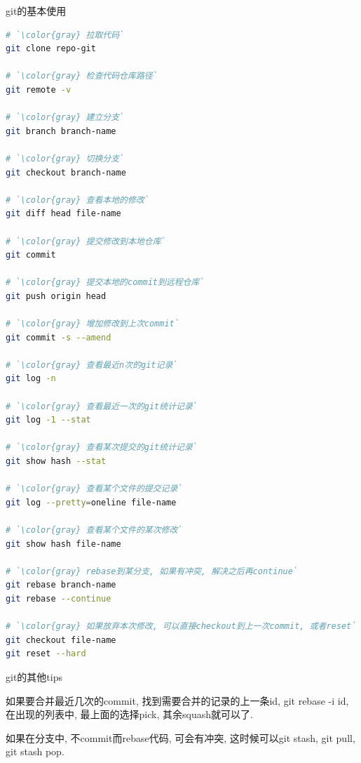 {\ZHH git的基本使用}\par
\begin{lstlisting}[language=bash]
# `\color{gray} 拉取代码`
git clone repo-git

# `\color{gray} 检查代码仓库路径`
git remote -v

# `\color{gray} 建立分支`
git branch branch-name

# `\color{gray} 切换分支`
git checkout branch-name

# `\color{gray} 查看本地的修改`
git diff head file-name

# `\color{gray} 提交修改到本地仓库`
git commit

# `\color{gray} 提交本地的commit到远程仓库`
git push origin head

# `\color{gray} 增加修改到上次commit`
git commit -s --amend

# `\color{gray} 查看最近n次的git记录`
git log -n

# `\color{gray} 查看最近一次的git统计记录`
git log -1 --stat

# `\color{gray} 查看某次提交的git统计记录`
git show hash --stat

# `\color{gray} 查看某个文件的提交记录`
git log --pretty=oneline file-name

# `\color{gray} 查看某个文件的某次修改`
git show hash file-name

# `\color{gray} rebase到某分支, 如果有冲突, 解决之后再continue`
git rebase branch-name
git rebase --continue

# `\color{gray} 如果放弃本次修改, 可以直接checkout到上一次commit, 或者reset`
git checkout file-name
git reset --hard
\end{lstlisting}
\vspace{10pt}


{\ZHH git的其他tips}\par
{如果要合并最近几次的commit, 找到需要合并的记录的上一条id, git rebase -i id, 在出现的列表中, 最上面的选择pick, 其余squash就可以了. }\par
{如果在分支中, 不commit而rebase代码, 可会有冲突, 这时候可以git stash, git pull, git stash pop. }


